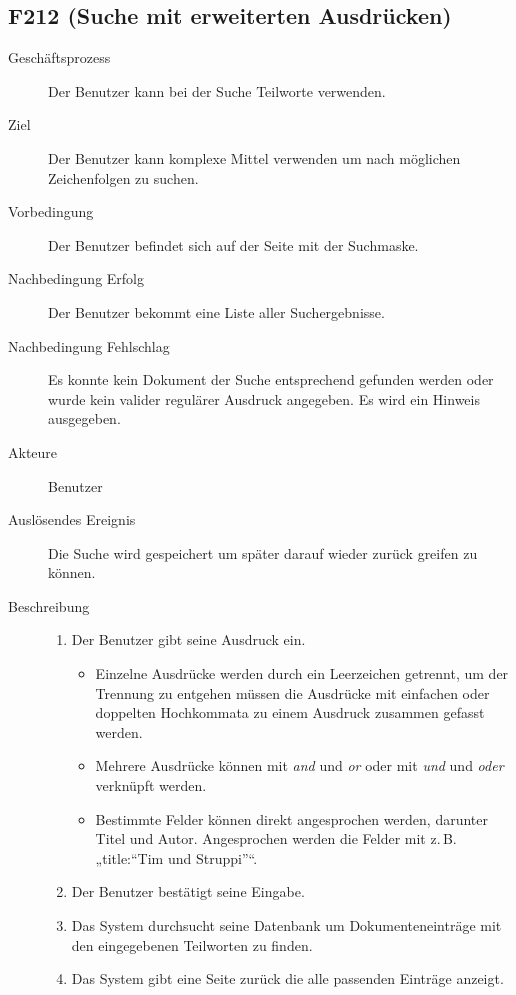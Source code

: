 \subsection{F212 (Suche mit erweiterten Ausdrücken)}
\label{F:extSuche}
\begin{description}
  \item[Geschäftsprozess]Der Benutzer kann bei der Suche Teilworte verwenden.
  \item[Ziel]Der Benutzer kann komplexe Mittel verwenden um nach möglichen Zeichenfolgen zu suchen.
  \item[Vorbedingung]Der Benutzer befindet sich auf der Seite mit der Suchmaske.
  \item[Nachbedingung Erfolg]Der Benutzer bekommt eine Liste aller Suchergebnisse.
  \item[Nachbedingung Fehlschlag]Es konnte kein Dokument der Suche entsprechend gefunden werden oder wurde kein valider regulärer Ausdruck angegeben. Es wird ein Hinweis ausgegeben.
  \item[Akteure]Benutzer
  \item[Auslösendes Ereignis]Die Suche wird gespeichert um später darauf wieder zurück greifen zu können.
  \item[Beschreibung]\hfill
    \begin{enumerate}
      \item Der Benutzer gibt seine Ausdruck ein. 
	\begin{itemize}
	  \item Einzelne Ausdrücke werden durch ein Leerzeichen getrennt, um der Trennung zu entgehen müssen die Ausdrücke mit einfachen oder doppelten Hochkommata zu einem Ausdruck zusammen gefasst werden. 
	  \item Mehrere Ausdrücke können mit \emph{and} und \emph{or} oder mit \emph{und} und \emph{oder} verknüpft werden.
	  \item Bestimmte Felder können direkt angesprochen werden, darunter Titel und Autor. Angesprochen werden die Felder mit z.\,B. „title:``Tim und Struppi''“.
	\end{itemize}
      \item Der Benutzer bestätigt seine Eingabe.
      \item Das System durchsucht seine Datenbank um Dokumenteneinträge mit den eingegebenen Teilworten zu finden.
      \item Das System gibt eine Seite zurück die alle passenden Einträge anzeigt.
    \end{enumerate}
\end{description}

